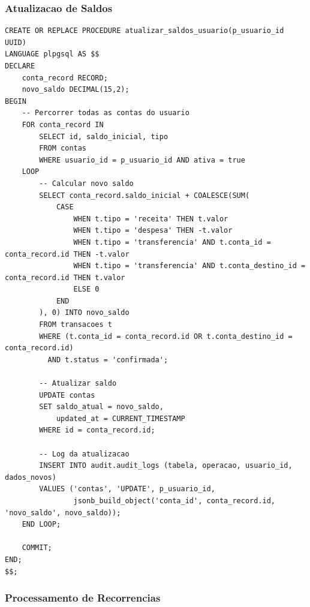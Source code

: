 \subsubsection{Atualizacao de Saldos}

\begin{lstlisting}[caption=Procedure para atualizar saldos de todas as contas]
CREATE OR REPLACE PROCEDURE atualizar_saldos_usuario(p_usuario_id UUID)
LANGUAGE plpgsql AS $$
DECLARE
    conta_record RECORD;
    novo_saldo DECIMAL(15,2);
BEGIN
    -- Percorrer todas as contas do usuario
    FOR conta_record IN 
        SELECT id, saldo_inicial, tipo
        FROM contas 
        WHERE usuario_id = p_usuario_id AND ativa = true
    LOOP
        -- Calcular novo saldo
        SELECT conta_record.saldo_inicial + COALESCE(SUM(
            CASE 
                WHEN t.tipo = 'receita' THEN t.valor
                WHEN t.tipo = 'despesa' THEN -t.valor
                WHEN t.tipo = 'transferencia' AND t.conta_id = conta_record.id THEN -t.valor
                WHEN t.tipo = 'transferencia' AND t.conta_destino_id = conta_record.id THEN t.valor
                ELSE 0
            END
        ), 0) INTO novo_saldo
        FROM transacoes t
        WHERE (t.conta_id = conta_record.id OR t.conta_destino_id = conta_record.id)
          AND t.status = 'confirmada';
        
        -- Atualizar saldo
        UPDATE contas 
        SET saldo_atual = novo_saldo,
            updated_at = CURRENT_TIMESTAMP
        WHERE id = conta_record.id;
        
        -- Log da atualizacao
        INSERT INTO audit.audit_logs (tabela, operacao, usuario_id, dados_novos)
        VALUES ('contas', 'UPDATE', p_usuario_id, 
                jsonb_build_object('conta_id', conta_record.id, 'novo_saldo', novo_saldo));
    END LOOP;
    
    COMMIT;
END;
$$;
\end{lstlisting}

\subsubsection{Processamento de Recorrencias}

